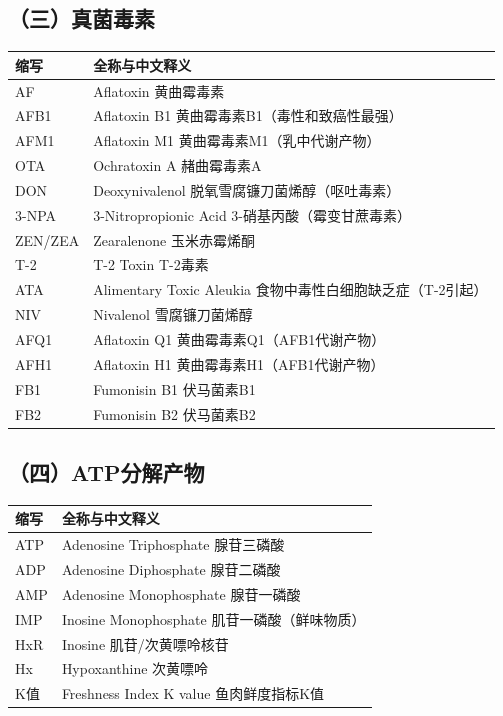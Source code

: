 \subsection*{（三）真菌毒素}

\begin{table}[H]
\centering
\begin{tabularx}{\textwidth}{lX}
\toprule
\textbf{缩写} & \textbf{全称与中文释义} \\
\midrule
AF & Aflatoxin \hfill 黄曲霉毒素 \\
AFB1 & Aflatoxin B1 \hfill 黄曲霉毒素B1（毒性和致癌性最强） \\
AFM1 & Aflatoxin M1 \hfill 黄曲霉毒素M1（乳中代谢产物） \\
OTA & Ochratoxin A \hfill 赭曲霉毒素A \\
DON & Deoxynivalenol \hfill 脱氧雪腐镰刀菌烯醇（呕吐毒素） \\
3-NPA & 3-Nitropropionic Acid \hfill 3-硝基丙酸（霉变甘蔗毒素） \\
ZEN/ZEA & Zearalenone \hfill 玉米赤霉烯酮 \\
T-2 & T-2 Toxin \hfill T-2毒素 \\
ATA & Alimentary Toxic Aleukia \hfill 食物中毒性白细胞缺乏症（T-2引起） \\
NIV & Nivalenol \hfill 雪腐镰刀菌烯醇 \\
AFQ1 & Aflatoxin Q1 \hfill 黄曲霉毒素Q1（AFB1代谢产物） \\
AFH1 & Aflatoxin H1 \hfill 黄曲霉毒素H1（AFB1代谢产物） \\
FB1 & Fumonisin B1 \hfill 伏马菌素B1 \\
FB2 & Fumonisin B2 \hfill 伏马菌素B2 \\
\bottomrule
\end{tabularx}
\end{table}

\subsection*{（四）ATP分解产物}

\begin{table}[H]
\centering
\begin{tabularx}{\textwidth}{lX}
\toprule
\textbf{缩写} & \textbf{全称与中文释义} \\
\midrule
ATP & Adenosine Triphosphate \hfill 腺苷三磷酸 \\
ADP & Adenosine Diphosphate \hfill 腺苷二磷酸 \\
AMP & Adenosine Monophosphate \hfill 腺苷一磷酸 \\
IMP & Inosine Monophosphate \hfill 肌苷一磷酸（鲜味物质） \\
HxR & Inosine \hfill 肌苷/次黄嘌呤核苷 \\
Hx & Hypoxanthine \hfill 次黄嘌呤 \\
K值 & Freshness Index K value \hfill 鱼肉鲜度指标K值 \\
\bottomrule
\end{tabularx}
\end{table}


